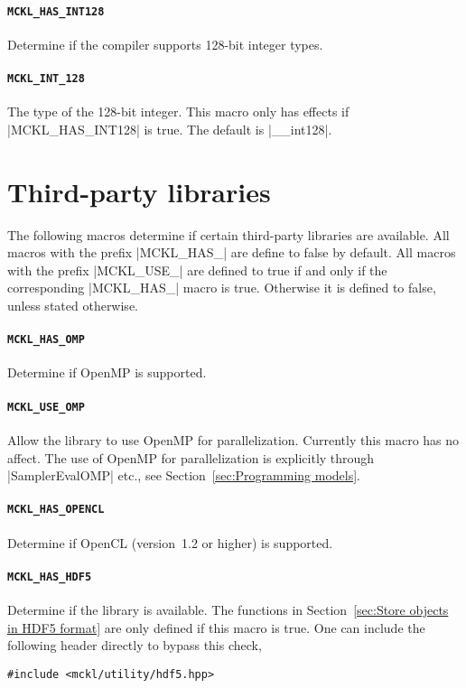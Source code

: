 \paragraph{\texttt{MCKL\_HAS\_INT128}} Determine if the compiler supports
128-bit integer types.

\paragraph{\texttt{MCKL\_INT\_128}} The type of the 128-bit integer. This macro
only has effects if |MCKL_HAS_INT128| is true. The default is |__int128|.

\section{Third-party libraries}
\label{sec:Third-party libraries}

The following macros determine if certain third-party libraries are available.
All macros with the prefix |MCKL_HAS_| are define to false by default. All
macros with the prefix |MCKL_USE_| are defined to true if and only if the
corresponding |MCKL_HAS_| macro is true. Otherwise it is defined to false,
unless stated otherwise.

\paragraph{\texttt{MCKL\_HAS\_OMP}} Determine if OpenMP is supported.

\paragraph{\texttt{MCKL\_USE\_OMP}} Allow the library to use OpenMP for
parallelization. Currently this macro has no affect. The use of OpenMP for
parallelization is explicitly through |SamplerEvalOMP| etc., see
Section~\ref{sec:Programming models}.

\paragraph{\texttt{MCKL\_HAS\_OPENCL}} Determine if OpenCL (version~1.2 or
higher) is supported.

\paragraph{\texttt{MCKL\_HAS\_HDF5}} Determine if the \hdf library is
available. The functions in Section~\ref{sec:Store objects in HDF5 format} are
only defined if this macro is true. One can include the following header
directly to bypass this check,
\begin{Verbatim}
#include <mckl/utility/hdf5.hpp>
\end{Verbatim}

